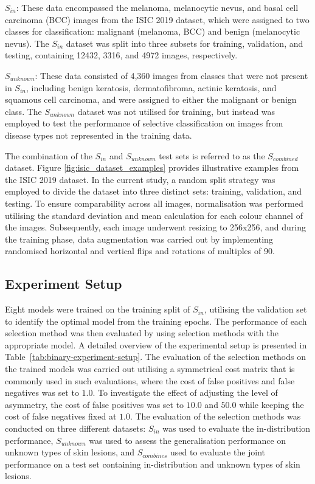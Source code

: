 $S_{in}$: These data encompassed the melanoma, melanocytic nevus, and basal cell carcinoma (BCC) images from the ISIC 2019 dataset, which were assigned to two classes for classification: malignant (melanoma, BCC) and benign (melanocytic nevus). The $S_{in}$ dataset was split into three subsets for training, validation, and testing, containing 12432, 3316, and 4972 images, respectively.

$S_{unknown}$: These data consisted of 4,360 images from classes that were not present in $S_{in}$, including benign keratosis, dermatofibroma, actinic keratosis, and squamous cell carcinoma, and were assigned to either the malignant or benign class. The $S_{unknown}$ dataset was not utilised for training, but instead was employed to test the performance of selective classification on images from disease types not represented in the training data.

The combination of the $S_{in}$ and $S_{unknown}$ test sets is referred to as the $S_{combined}$ dataset. Figure \ref{fig:isic_dataset_examples} provides illustrative examples from the ISIC 2019 dataset. In the current study, a random split strategy was employed to divide the dataset into three distinct sets: training, validation, and testing. To ensure comparability across all images, normalisation was performed utilising the standard deviation and mean calculation for each colour channel of the images. Subsequently, each image underwent resizing to 256x256, and during the training phase, data augmentation was carried out by implementing randomised horizontal and vertical flips and rotations of multiples of 90\textdegree.

\subsection{Experiment Setup}
Eight models were trained on the training split of $S_{in}$, utilising the validation set to identify the optimal model from the training epochs. The performance of each selection method was then evaluated by using selection methods with the appropriate model. A detailed overview of the experimental setup is presented in Table~\ref{tab:binary-experiment-setup}. The evaluation of the selection methods on the trained models was carried out utilising a symmetrical cost matrix that is commonly used in such evaluations, where the cost of false positives and false negatives was set to $1.0$. To investigate the effect of adjusting the level of asymmetry, the cost of false positives was set to $10.0$ and $50.0$ while keeping the cost of false negatives fixed at $1.0$. The evaluation of the selection methods was conducted on three different datasets: $S_{in}$ was used to evaluate the in-distribution performance, $S_{unknown}$ was used to assess the generalisation performance on unknown types of skin lesions, and $S_{combines}$ used to evaluate the joint performance on a test set containing in-distribution and unknown types of skin lesions.

